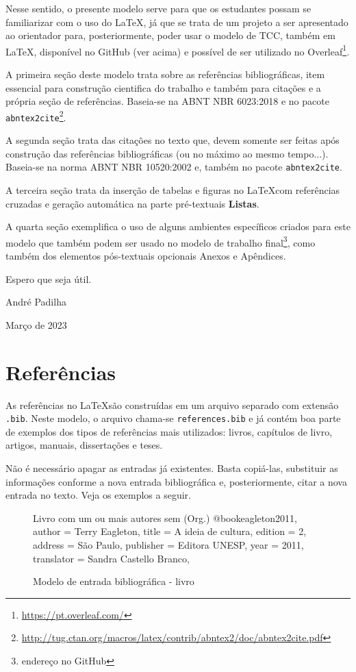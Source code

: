 \documentclass[a4paper,12pt,oneside]{memoir}
\begin{document}
Nesse sentido, o presente modelo serve para que os estudantes possam se familiarizar com o uso do \LaTeX, já que se trata de um projeto a ser apresentado ao orientador para, posteriormente, poder usar o modelo de TCC, também em \LaTeX, disponível no GitHub (ver acima) e possível de ser utilizado no Overleaf\footnote{\url{https://pt.overleaf.com/}}.

A primeira seção deste modelo trata sobre as referências bibliográficas, item essencial para construção cientifica do trabalho e também para citações e a própria seção de referências. Baseia-se na ABNT NBR 6023:2018 e no pacote \verb|abntex2cite|\footnote{\url{http://tug.ctan.org/macros/latex/contrib/abntex2/doc/abntex2cite.pdf}}.

A segunda seção trata das citações no texto que, devem somente ser feitas após construção das referências bibliográficas (ou no máximo ao mesmo tempo...). Baseia-se na norma ABNT NBR 10520:2002 e, também no pacote \verb|abntex2cite|.

A terceira seção trata da inserção de tabelas e figuras no \LaTeX com referências cruzadas e geração automática na parte pré-textuais \textbf{Listas}.

A quarta seção exemplifica o uso de alguns ambientes específicos criados para este modelo que também podem ser usado no modelo de trabalho final\footnote{endereço no GitHub}, como também dos elementos pós-textuais opcionais Anexos e Apêndices.

Espero que seja útil.

\begin{flushright}
André Padilha

Março de 2023
\end{flushright}

\chapter{Referências}
As referências no \LaTeX são construídas em um arquivo separado com extensão \verb|.bib|. Neste modelo, o arquivo chama-se \verb|references.bib| e já contém boa parte de exemplos dos tipos de referências mais utilizados: livros, capítulos de livro, artigos, manuais, dissertações e teses.

Não é necessário apagar as entradas já existentes. Basta copiá-las, substituir as informações conforme a nova entrada bibliográfica e, posteriormente, citar a nova entrada no texto. Veja os exemplos a seguir.
\ \\
\begin{figure}[h!]
\begin{codex}{Livro com um ou mais autores sem (Org.)}
@book{eagleton2011,
	author     = {Terry Eagleton},
	title      = {A ideia de cultura},
	edition    = {2},
	address   = {São Paulo},
	publisher  = {Editora UNESP},
	year       = {2011},
	translator = {Sandra Castello Branco},
}
\end{codex}
\caption{Modelo de entrada bibliográfica - livro}
    \label{fig:codex1}
\end{figure}
\end{document}
